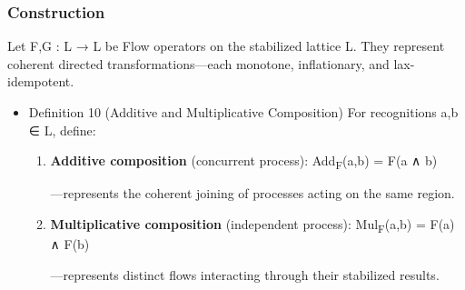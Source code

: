 \documentclass[11pt]{article}
\begin{document}
\subsubsection*{Construction}
\label{sec:org65a8844}
Let F,G : L → L be Flow operators on the stabilized lattice L.  
They represent coherent directed transformations—each monotone, inflationary, and lax-idempotent.
\begin{itemize}
\item Definition 10 (Additive and Multiplicative Composition)
\label{sec:orgf6a8a9c}
For recognitions a,b ∈ L, define:

\begin{enumerate}
\item \textbf{Additive composition} (concurrent process):  
Add\textsubscript{F}(a,b) = F(a ∧ b)

—represents the coherent joining of processes acting on the same region.

\item \textbf{Multiplicative composition} (independent process):  
Mul\textsubscript{F}(a,b) = F(a) ∧ F(b)

—represents distinct flows interacting through their stabilized results.


\end{enumerate}
\end{itemize}
\end{document}
